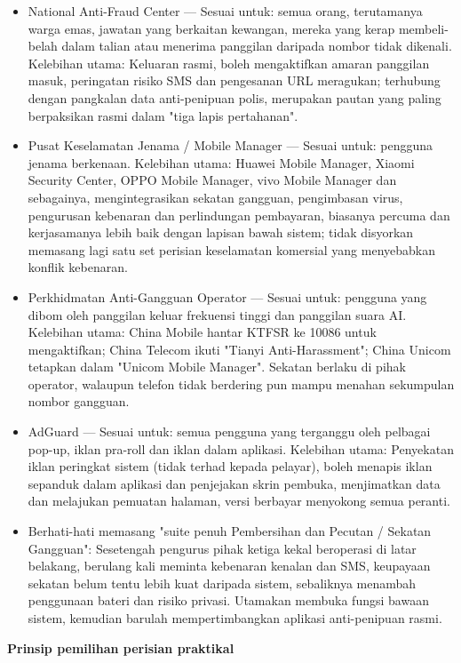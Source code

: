 \begin{itemize}
  \item National Anti-Fraud Center — Sesuai untuk: semua orang, terutamanya warga emas, jawatan yang berkaitan kewangan, mereka yang kerap membeli-belah dalam talian atau menerima panggilan daripada nombor tidak dikenali. Kelebihan utama: Keluaran rasmi, boleh mengaktifkan amaran panggilan masuk, peringatan risiko SMS dan pengesanan URL meragukan; terhubung dengan pangkalan data anti-penipuan polis, merupakan pautan yang paling berpaksikan rasmi dalam "tiga lapis pertahanan".
  \item Pusat Keselamatan Jenama / Mobile Manager — Sesuai untuk: pengguna jenama berkenaan. Kelebihan utama: Huawei Mobile Manager, Xiaomi Security Center, OPPO Mobile Manager, vivo Mobile Manager dan sebagainya, mengintegrasikan sekatan gangguan, pengimbasan virus, pengurusan kebenaran dan perlindungan pembayaran, biasanya percuma dan kerjasamanya lebih baik dengan lapisan bawah sistem; tidak disyorkan memasang lagi satu set perisian keselamatan komersial yang menyebabkan konflik kebenaran.
  \item Perkhidmatan Anti-Gangguan Operator — Sesuai untuk: pengguna yang dibom oleh panggilan keluar frekuensi tinggi dan panggilan suara AI. Kelebihan utama: China Mobile hantar KTFSR ke 10086 untuk mengaktifkan; China Telecom ikuti "Tianyi Anti-Harassment"; China Unicom tetapkan dalam "Unicom Mobile Manager". Sekatan berlaku di pihak operator, walaupun telefon tidak berdering pun mampu menahan sekumpulan nombor gangguan.
  \item AdGuard — Sesuai untuk: semua pengguna yang terganggu oleh pelbagai pop-up, iklan pra-roll dan iklan dalam aplikasi. Kelebihan utama: Penyekatan iklan peringkat sistem (tidak terhad kepada pelayar), boleh menapis iklan sepanduk dalam aplikasi dan penjejakan skrin pembuka, menjimatkan data dan melajukan pemuatan halaman, versi berbayar menyokong semua peranti.
  \item Berhati-hati memasang "suite penuh Pembersihan dan Pecutan / Sekatan Gangguan": Sesetengah pengurus pihak ketiga kekal beroperasi di latar belakang, berulang kali meminta kebenaran kenalan dan SMS, keupayaan sekatan belum tentu lebih kuat daripada sistem, sebaliknya menambah penggunaan bateri dan risiko privasi. Utamakan membuka fungsi bawaan sistem, kemudian barulah mempertimbangkan aplikasi anti-penipuan rasmi.
\end{itemize}

\textbf{Prinsip pemilihan perisian praktikal}\par


